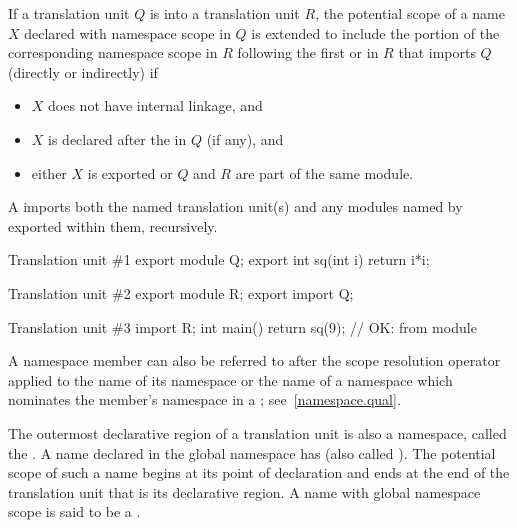 \pnum
If a translation unit $Q$ is  into a translation unit $R$,
the potential scope of a name $X$ declared with namespace scope in $Q$
is extended to include the portion of the corresponding namespace
scope in $R$ following the first 
or 
in $R$ that imports $Q$ (directly or indirectly) if
\begin{itemize}
\item $X$ does not have internal linkage, and
\item $X$ is declared after the  in $Q$ (if any), and
\item either $X$ is exported or $Q$ and $R$ are part of the same module.
\end{itemize}
\begin{note}
A  imports both
the named translation unit(s) and
any modules named by exported
 within them,
recursively.
\begin{example}
\begin{codeblocktu}{Translation unit \#1}
export module Q;
export int sq(int i) { return i*i; }
\end{codeblocktu}

\begin{codeblocktu}{Translation unit \#2}
export module R;
export import Q;
\end{codeblocktu}

\begin{codeblocktu}{Translation unit \#3}
import R;
int main() { return sq(9); }    // OK:  from module 
\end{codeblocktu}
\end{example}
\end{note}

\pnum
A namespace member can also be referred to after the \tcode{::} scope
resolution operator applied to the name of its
namespace or the name of a namespace which nominates the member's
namespace in a ; see~\ref{namespace.qual}.

\pnum
The outermost declarative region of a translation unit is also a
namespace, called the . A name declared in
the global namespace has  (also called
). The potential scope of such a name begins at
its point of declaration and ends at the end
of the translation unit that is its declarative region.
A name with global namespace scope is said to be a
.

